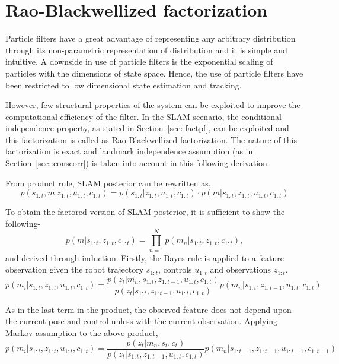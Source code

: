 
\chapter{Rao-Blackwellized factorization} \label{chap::rbpf}
Particle filters have a great advantage of representing any arbitrary distribution through its non-parametric representation of distribution and it is simple and intuitive. A downside in use of particle filters is the exponential scaling of particles with the dimensions of state space. Hence, the use of particle filters have been restricted to low dimensional state estimation and tracking.

However, few structural properties of the system can be exploited to improve the computational efficiency of the filter. In the SLAM scenario, the conditional independence property, as stated in Section~\ref{sec::factpf}, can be exploited and this factorization is called as Rao-Blackwellized factorization. The nature of this factorization is exact and landmark independence assumption (as in Section~\ref{sec::conscorr}) is taken into account in this following derivation.

From product rule, SLAM posterior can be rewritten as,
\begin{equation}
p(s_{1:t},m|z_{1:t},u_{1:t},c_{1:t})=p(s_{1:t}|z_{1:t},u_{1:t},c_{1:t})\cdot p(m|s_{1:t},z_{1:t},u_{1:t},c_{1:t})
\end{equation}  

To obtain the factored version of SLAM posterior, it is sufficient to show the following-
\begin{equation}
p(m|s_{1:t},z_{1:t},c_{1:t}) = \prod_{n=1}^N p(m_n|s_{1:t},z_{1:t},c_{1:t}),
\end{equation}
and derived through induction. Firstly, the Bayes rule is applied to a feature observation given the robot trajectory $s_{1:t}$, controls $u_{1:t}$ and observations $z_{1:t}$.
\begin{equation}
p(m_i|s_{1:t},z_{1:t},u_{1:t},c_{1:t}) = \frac{p(z_t|m_n,s_{1:t},z_{1:t-1},u_{1:t},c_{1:t})}{p(z_t|s_{1:t},z_{1:t-1},u_{1:t},c_{1:t})}p(m_n|s_{1:t},z_{1:t-1},u_{1:t},c_{1:t})
\end{equation}

As in the last term in the product, the observed feature does not depend upon the current pose and control unless with the current observation. Applying Markov assumption to the above product,
\begin{equation}
p(m_i|s_{1:t},z_{1:t},u_{1:t},c_{1:t}) = \frac{p(z_t|m_n,s_t,c_t)}{p(z_t|s_{1:t},z_{1:t-1},u_{1:t},c_{1:t})}p(m_n|s_{1:t-1},z_{1:t-1},u_{1:t-1},c_{1:t-1})
\label{eq1_rbpf}
\end{equation}

